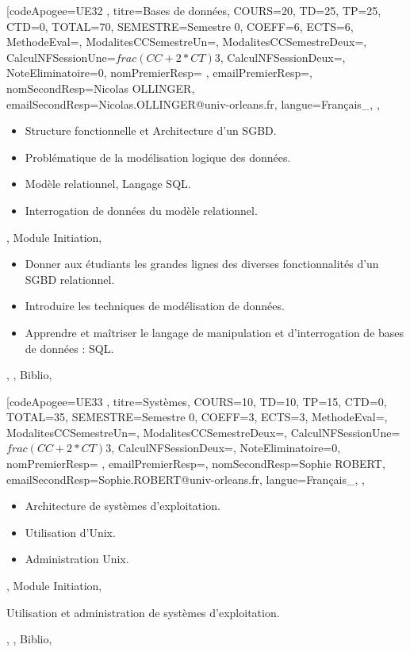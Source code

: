 \module[codeApogee={UE32 },
titre={Bases de données},
COURS={20},
TD={25},
TP={25},
CTD={0},
TOTAL={70},
SEMESTRE={Semestre 0},
COEFF={6},
ECTS={6},
MethodeEval={},
ModalitesCCSemestreUn={},
ModalitesCCSemestreDeux={},
CalculNFSessionUne={$frac{(CC+2*CT)}{3}$},
CalculNFSessionDeux={},
NoteEliminatoire={0},
nomPremierResp={ },
emailPremierResp={},
nomSecondResp={Nicolas OLLINGER},
emailSecondResp={Nicolas.OLLINGER@univ-orleans.fr},
langue={Français_},
{},
{\begin{itemize}
\item Structure fonctionnelle et Architecture d'un SGBD.
  \item Problématique de la modélisation logique des données.
  \item Modèle relationnel, Langage SQL.
  \item Interrogation de données du modèle relationnel.
\end{itemize}},
{Module Initiation},
{\begin{itemize}
\item Donner aux étudiants les grandes lignes des diverses fonctionnalités d'un SGBD relationnel.   
  \item Introduire les techniques de modélisation de données.  
  \item Apprendre et maîtriser le langage de manipulation et d'interrogation de bases de données : SQL.
\end{itemize}},
{},
{Biblio},

\vfill


\module[codeApogee={UE33 },
titre={Systèmes},
COURS={10},
TD={10},
TP={15},
CTD={0},
TOTAL={35},
SEMESTRE={Semestre 0},
COEFF={3},
ECTS={3},
MethodeEval={},
ModalitesCCSemestreUn={},
ModalitesCCSemestreDeux={},
CalculNFSessionUne={$frac{(CC+2*CT)}{3}$},
CalculNFSessionDeux={},
NoteEliminatoire={0},
nomPremierResp={ },
emailPremierResp={},
nomSecondResp={Sophie ROBERT},
emailSecondResp={Sophie.ROBERT@univ-orleans.fr},
langue={Français_},
{},
{\begin{itemize}
\item Architecture de systèmes d'exploitation.
  \item Utilisation d'Unix.
  \item Administration Unix.
\end{itemize}},
{Module Initiation},
{\begin{itemize}
\ObjItem Utilisation et administration de systèmes d'exploitation.
\end{itemize}},
{},
{Biblio},

